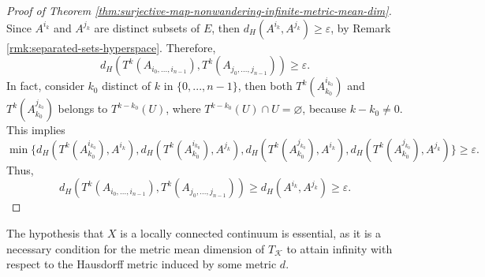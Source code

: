\documentclass[sn-mathphys-num]{sn-jnl}%
\theoremstyle{thmstyleone}%
\newtheorem{lemma}{Lemma}
\theoremstyle{thmstyletwo}%
\theoremstyle{thmstylethree}%
\newcommand*\induce[1]{#1_\mathcal{K}}
\begin{document}
\begin{proof}[Proof of Theorem \emph{\ref{thm:surjective-map-nonwandering-infinite-metric-mean-dim}}]
\begin{equation*}
    \end{equation*}
    Since $A^{i_k}$ and $A^{j_k}$ are distinct subsets of $E$, then $d_H(A^{i_k}, A^{j_k}) \geq \varepsilon$, by Remark \ref{rmk:separated-sets-hyperspace}. Therefore,
    \begin{equation*}
        d_H(T^k(A_{i_0, ..., i_{n - 1}}), T^k(A_{j_0, ..., j_{n - 1}})) \geq \varepsilon.
    \end{equation*}
    In fact, consider $k_0$ distinct of $k$ in $\{0, ..., n - 1\}$, then both $T^k(A_{k_0}^{i_{k_0}})$ and $T^k(A_{k_0}^{j_{k_0}})$ belongs to $T^{k - k_0}(U)$, where $T^{k - k_0}(U) \cap U = \varnothing$, because $k - k_0 \neq 0$. This implies
    \begin{equation*}
        \min\{d_H(T^k(A_{k_0}^{i_{k_0}}), A^{i_k}), d_H(T^k(A_{k_0}^{i_{k_0}}), A^{j_k}), d_H(T^k(A_{k_0}^{j_{k_0}}), A^{i_k}), d_H(T^k(A_{k_0}^{j_{k_0}}), A^{j_k})\} \geq \varepsilon.
    \end{equation*}
    Thus,
    \begin{equation*}
        d_H(T^k(A_{i_0, ..., i_{n - 1}}), T^k(A_{j_0, ..., j_{n - 1}})) \geq d_H(A^{i_k}, A^{j_k}) \geq \varepsilon.
    \end{equation*}
\end{proof}

The hypothesis that $X$ is a locally connected continuum is essential, as it is a necessary condition for the metric mean dimension of $\induce{T}$ to attain infinity with respect to the Hausdorff metric induced by some metric $d$.





\end{document}
